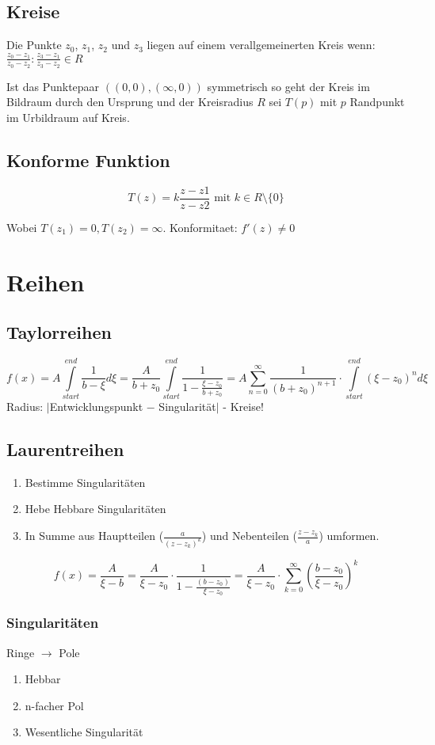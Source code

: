 \documentclass[10pt,a4paper]{article}
\begin{document}
\subsection{Kreise}
Die Punkte $z_0$, $z_1$, $z_2$ und $z_3$ liegen auf einem verallgemeinerten Kreis wenn:
$\frac{z_0-z_1}{z_0-z_2} : \frac{z_3-z_1}{z_3-z_2} \in R$

Ist das Punktepaar $((0,0), (\infty, 0))$ symmetrisch so geht der Kreis im Bildraum durch den Ursprung und der Kreisradius $R$ sei $T(p)$ mit $p$ Randpunkt im Urbildraum auf Kreis.

\subsection{Konforme Funktion}
\[T(z) = k \frac{z-z1}{z-z2} \mbox{ mit } k \in R\setminus \lbrace 0 \rbrace\]

Wobei $T(z_1)=0, T(z_2)=\infty$. Konformitaet: $f'(z) \neq 0$

\section{Reihen}
\subsection{Taylorreihen}
\[
f(x) = A \int\limits_{start}^{end} \frac{1}{b - \xi} d\xi = \frac{A}{b+z_0} \int\limits_{start}^{end} \frac{1}{1- \frac{\xi - z_0}{b+z_0}} = A \sum\limits_{n=0}^\infty \frac{1}{(b+z_0)^{n+1}} \cdot \int\limits_{start}^{end} (\xi-z_0)^n d\xi
\]
Radius: $|$Entwicklungspunkt $ - $ Singularität$|$ - Kreise!

\subsection{Laurentreihen}
\begin{enumerate}
\item Bestimme Singularitäten
\item Hebe Hebbare Singularitäten
\item In Summe aus Hauptteilen ($ \frac{a}{(z-z_k)^k}$) und Nebenteilen ($ \frac{z-z_k}{a}$) umformen.
\end{enumerate}

\[
f(x)= \frac{A}{\xi - b}
= \frac{A}{\xi - z_0} \cdot \frac{1}{1 -\frac{(b-z_0)}{\xi - z_0}}
= \frac{A}{\xi - z_0} \cdot \sum\limits_{k=0}^\infty \left(\frac{b-z_0}{\xi - z_0}\right) ^k
\]

\subsubsection{Singularitäten}
Ringe $\rightarrow$ Pole
\begin{enumerate}
 \item Hebbar
 \item n-facher Pol
 \item Wesentliche Singularität
\end{enumerate}
\end{document}
